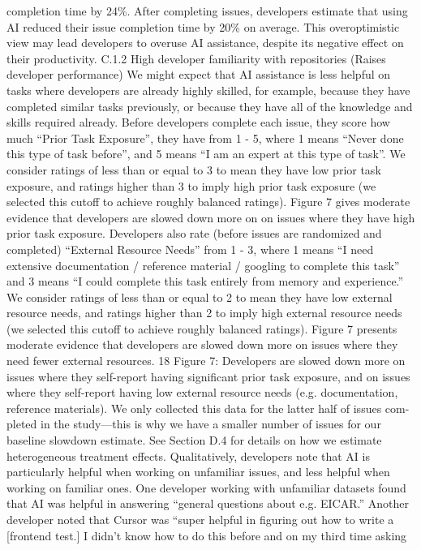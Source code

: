 completion time by 24\%. After completing issues, developers estimate that using AI reduced their
issue completion time by 20\% on average. This overoptimistic view may lead developers to overuse
AI assistance, despite its negative effect on their productivity.
C.1.2
High developer familiarity with repositories (Raises developer performance)
We might expect that AI assistance is less helpful on tasks where developers are already highly
skilled, for example, because they have completed similar tasks previously, or because they have all
of the knowledge and skills required already.
Before developers complete each issue, they score how much “Prior Task Exposure”, they have
from 1 - 5, where 1 means “Never done this type of task before”, and 5 means “I am an expert at
this type of task”. We consider ratings of less than or equal to 3 to mean they have low prior task
exposure, and ratings higher than 3 to imply high prior task exposure (we selected this cutoff to
achieve roughly balanced ratings).
Figure 7 gives moderate evidence that developers are slowed down more on on issues where they
have high prior task exposure.
Developers also rate (before issues are randomized and completed) “External Resource Needs” from
1 - 3, where 1 means “I need extensive documentation / reference material / googling to complete this
task” and 3 means “I could complete this task entirely from memory and experience.” We consider
ratings of less than or equal to 2 to mean they have low external resource needs, and ratings higher
than 2 to imply high external resource needs (we selected this cutoff to achieve roughly balanced
ratings). Figure 7 presents moderate evidence that developers are slowed down more on issues where
they need fewer external resources.
18
Figure 7: Developers are slowed down more on issues where they self-report having significant
prior task exposure, and on issues where they self-report having low external resource needs (e.g.
documentation, reference materials). We only collected this data for the latter half of issues com-
pleted in the study—this is why we have a smaller number of issues for our baseline slowdown
estimate. See Section D.4 for details on how we estimate heterogeneous treatment effects.
Qualitatively, developers note that AI is particularly helpful when working on unfamiliar issues, and
less helpful when working on familiar ones.
One developer working with unfamiliar datasets found that AI was helpful in answering “general
questions about e.g. EICAR.” Another developer noted that Cursor was “super helpful in figuring
out how to write a [frontend test.] I didn’t know how to do this before and on my third time asking
